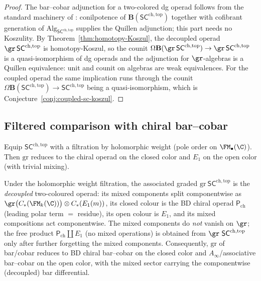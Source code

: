 \begin{proof}
The bar--cobar adjunction for a two-colored dg operad follows from the
standard machinery of \cite{GK94,Val07}: conilpotence of
$\mathbf B(\mathsf{SC}^{\mathrm{ch,top}})$ together with cofibrant
generation of $\mathrm{Alg}_{\mathsf{SC}^{\mathrm{ch,top}}}$ supplies
the Quillen adjunction; this part needs no Koszulity. By
Theorem~\ref{thm:homotopy-Koszul}, the decoupled operad
$\gr\,\mathsf{SC}^{\mathrm{ch,top}}$ is homotopy-Koszul, so the counit
$\Omega\mathbf B(\gr\,\mathsf{SC}^{\mathrm{ch,top}})\to
\gr\,\mathsf{SC}^{\mathrm{ch,top}}$ is a quasi-isomorphism of dg
operads and the adjunction for $\gr$-algebras is a Quillen
equivalence: unit and counit on algebras are weak equivalences. For
the coupled operad the same implication runs through the counit
$\Omega\mathbf B(\mathsf{SC}^{\mathrm{ch,top}})\to
\mathsf{SC}^{\mathrm{ch,top}}$ being a quasi-isomorphism, which is
Conjecture~\ref{conj:coupled-sc-koszul}.
\end{proof}

\subsection{Filtered comparison with chiral bar--cobar}
\label{subsec:filtered-compare}
Equip $\mathsf{SC}^{\mathrm{ch,top}}$ with a filtration by holomorphic weight (pole order on $\FM_\bullet(\C)$). Then $\mathrm{gr}$ reduces to the chiral operad on the closed color and $E_1$ on the open color (with trivial mixing).

\begin{proposition}
\label{prop:gr-chiral}
Under the holomorphic weight filtration, the associated graded
$\mathrm{gr}\ \mathsf{SC}^{\mathrm{ch,top}}$ is the
\emph{decoupled} two-coloured operad: its mixed components split
componentwise as
$\gr\bigl(C_\ast(\FM_k(\C))\bigr) \otimes C_\ast(E_1(m))$, its
closed colour is the BD chiral operad $\mathsf P_{\mathrm{ch}}$
(leading polar term $=$ residue), its open colour is $E_1$, and
its mixed compositions act componentwise. The mixed components do
\emph{not} vanish on $\gr$; the free product
$\mathsf P_{\mathrm{ch}} \amalg E_1$ (no mixed operations) is
obtained from $\gr\ \mathsf{SC}^{\mathrm{ch,top}}$ only after
further forgetting the mixed components. Consequently,
$\mathrm{gr}$ of bar/cobar reduces to BD chiral bar--cobar on the
closed color and $A_\infty$/associative bar--cobar on the open
color, with the mixed sector carrying the componentwise
(decoupled) bar differential.
\end{proposition}

